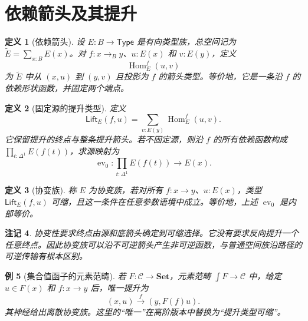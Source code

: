 \documentclass[12pt,oneside,openany,fontset=none]{ctexbook}
\theoremstyle{cn}
\newtheorem{definition}{定义}[chapter]
\newtheorem{example}[definition]{例}
\newtheorem{remark}[definition]{注记}
\numberwithin{equation}{chapter}
\newcommand{\Set}{\mathbf{Set}}
\newcommand{\Hom}{\operatorname{Hom}}
\newcommand{\ev}{\operatorname{ev}}
\begin{document}
\section{依赖箭头及其提升}
\begin{definition}[依赖箭头]
设 $E:B\to\mathsf{Type}$ 是有向类型族，总空间记为 $\widetilde E=\sum_{x:B}E(x)$。对 $f:x\to_B y$、$u:E(x)$ 和 $v:E(y)$，定义
\[
\Hom_E^f(u,v)
\]
为 $\widetilde E$ 中从 $(x,u)$ 到 $(y,v)$ 且投影为 $f$ 的箭头类型。等价地，它是一条沿 $f$ 的依赖形状函数，并固定两个端点。
\end{definition}
\begin{definition}[固定源的提升类型]
定义
\[
\mathsf{Lift}_E(f,u)=\sum_{v:E(y)}\Hom_E^f(u,v).
\]
它保留提升的终点与整条提升箭头。若不固定源，则沿 $f$ 的所有依赖函数构成 $\prod_{t:\Delta^1}E(f(t))$，求源映射为
\[
\ev_0:\prod_{t:\Delta^1}E(f(t))\to E(x).
\]
\end{definition}
\begin{definition}[协变族]\label{def:covariant}
称 $E$ 为协变族，若对所有 $f:x\to y$、$u:E(x)$，类型 $\mathsf{Lift}_E(f,u)$ 可缩，且这一条件在任意参数语境中成立。等价地，上述 $\ev_0$ 是内部等价。
\end{definition}
\begin{remark}
协变性要求终点由源和底箭头确定到可缩选择。它没有要求反向提升一个任意终点。因此协变族可以沿不可逆箭头产生非可逆函数，与普通空间族沿路径的可逆传输有根本区别。
\end{remark}
\begin{example}[集合值函子的元素范畴]
若 $F:\mathcal C\to\Set$，元素范畴 $\int F\to\mathcal C$ 中，给定 $u\in F(x)$ 和 $f:x\to y$ 后，唯一提升为
\[
(x,u)\xrightarrow{f}(y,F(f)u).
\]
其神经给出离散协变族。这里的“唯一”在高阶版本中替换为“提升类型可缩”。
\end{example}
\end{document}
